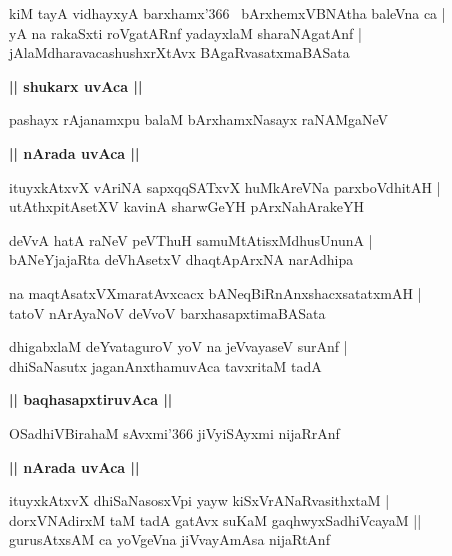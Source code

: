 \documentclass[twoside,12pt,openright]{book}
\newcounter{shloka}[chapter]
\def\uvaca#1{\centerline{{\large\textbf{#1}}}}
\begin{document}
\begin{shloka}%
kiM tayA vidhayxyA barxhamx\char'366 ~bArxhemxVBNAtha baleVna ca |\\
yA na rakaSxti roVgatARnf yadayxlaM sharaNAgatAnf |\\
jAlaMdharavacashushxrXtAvx BAgaRvasatxmaBASata
\end{shloka}

\uvaca{|| shukarx uvAca ||}

\begin{shloka}%
pashayx rAjanamxpu balaM bArxhamxNasayx raNAMgaNeV
\end{shloka}

\uvaca{|| nArada uvAca ||}

\begin{shloka}%
ituyxkAtxvX vAriNA sapxqqSATxvX huMkAreVNa parxboVdhitAH |\\
utAthxpitAsetXV kavinA sharwGeYH pArxNahArakeYH 
\end{shloka}

\begin{shloka}%
deVvA hatA raNeV peVThuH samuMtAtisxMdhusUnunA |\\
bANeYjajaRta deVhAsetxV dhaqtApArxNA narAdhipa
\end{shloka}

\begin{shloka}%
na maqtAsatxVXmaratAvxcacx bANeqBiRnAnxshacxsatatxmAH |\\
tatoV nArAyaNoV deVvoV barxhasapxtimaBASata
\end{shloka}

\begin{shloka}%
dhigabxlaM deYvataguroV yoV na jeVvayaseV surAnf |\\
dhiSaNasutx jaganAnxthamuvAca tavxritaM tadA 
\end{shloka}

\uvaca{|| baqhasapxtiruvAca ||}

\begin{shloka}%
OSadhiVBirahaM sAvxmi\char'366 jiVyiSAyxmi nijaRrAnf
\end{shloka}

\uvaca {|| nArada uvAca ||}

\begin{shloka}%
ituyxkAtxvX dhiSaNasosxVpi yayw kiSxVrANaRvasithxtaM |\\
dorxVNAdirxM taM tadA gatAvx suKaM gaqhwyxSadhiVcayaM ||\\
gurusAtxsAM ca yoVgeVna jiVvayAmAsa nijaRtAnf 
\end{shloka}
\end{document}
